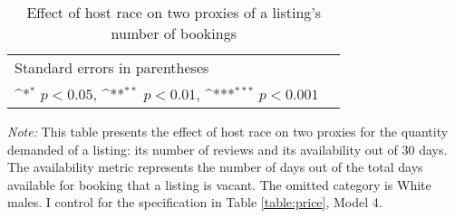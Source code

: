 \begin{table}[htbp]\centering
	\def\sym#1{\ifmmode^{#1}\else\(^{#1}\)\fi}
	\caption{Effect of host race on two proxies of a listing's number of bookings}
	\begin{tabular}{l*{2}{c}}
		\hline\hline
		
		\hline\hline
		\multicolumn{2}{l}{\footnotesize Standard errors in parentheses}\\
		\multicolumn{2}{l}{\footnotesize \sym{*} \(p<0.05\), \sym{**} \(p<0.01\), \sym{***} \(p<0.001\)}\\
	\end{tabular}
\label{table:quantity_demanded}
	\begin{tablenotes}
		
		\item {\it Note:} This table presents the effect of host race on two proxies for the quantity demanded of a listing: its number of reviews and its availability out of 30 days. The availability metric represents the number of days out of the total days available for booking that a listing is vacant. The omitted category is White males. I control for the specification in Table \ref{table:price}, Model 4.
		
	\end{tablenotes}
\end{table}



